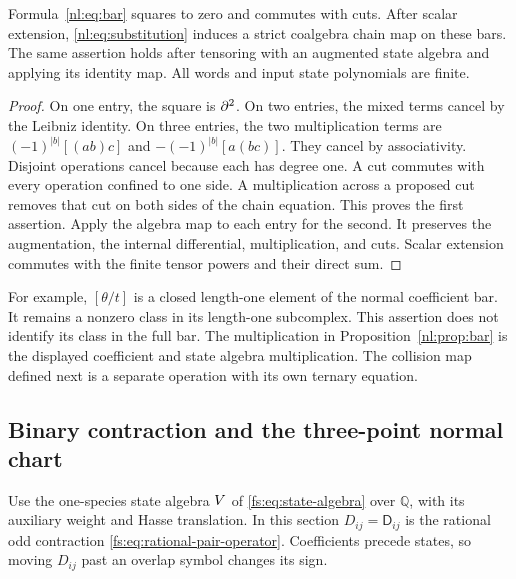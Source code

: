 \begin{proposition}\label{nl:prop:bar}
Formula~\eqref{nl:eq:bar} squares to zero and commutes with cuts.
After scalar extension, \eqref{nl:eq:substitution} induces a strict
coalgebra chain map on these bars. The same assertion holds after
tensoring with an augmented state algebra and applying its identity map.
All words and input state polynomials are finite.
\end{proposition}

\begin{proof}
On one entry, the square is \(\partial^2\). On two entries,
the mixed terms cancel by the Leibniz identity. On three entries,
the two multiplication terms are
\((-1)^{|b|}[(ab)c]\) and \(-(-1)^{|b|}[a(bc)]\).
They cancel by associativity. Disjoint operations cancel because
each has degree one. A cut commutes with every operation confined
to one side. A multiplication across a proposed cut removes that
cut on both sides of the chain equation. This proves the first assertion.
Apply the algebra map to each entry for the second. It preserves
the augmentation, the internal differential, multiplication, and cuts.
Scalar extension commutes with the finite tensor powers and their direct sum.
\end{proof}

For example, \([\theta/t]\) is a closed length-one element of the
normal coefficient bar. It remains a nonzero class in its length-one
subcomplex. This assertion does not identify its class in the full bar.
The multiplication in Proposition~\ref{nl:prop:bar} is the displayed
coefficient and state algebra multiplication. The collision map defined
next is a separate operation with its own ternary equation.

\subsection{Binary contraction and the three-point normal chart}

Use the one-species state algebra \(V\) of
\eqref{fs:eq:state-algebra} over \(\mathbb Q\), with its auxiliary
weight and Hasse translation.  In this section
\(D_{ij}=\mathsf D_{ij}\) is the rational odd contraction
\eqref{fs:eq:rational-pair-operator}.  Coefficients precede states,
so moving \(D_{ij}\) past an overlap symbol changes its sign.

